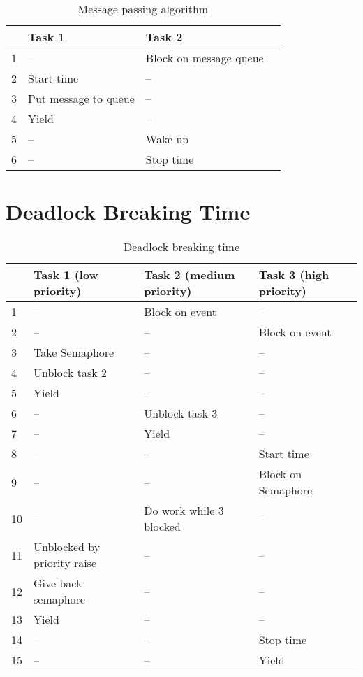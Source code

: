 \begin{table}[htbp]
	\centering
		\begin{tabular}{|l|l|l|l|}
			\hline
				& Task 1 							 & Task 2 								\\
				\hline 
				1 & --									 & Block on message queue	\\
			  2 & Start time		 			 & --											\\
			  3 & Put message to queue & --											\\
			  4 & Yield								 & --											\\
			  5 & --									 & Wake up								\\
			  6 & --									 & Stop time							\\	  
			\hline
		\end{tabular}
	\caption{Message passing algorithm}
	\label{tab_message_passing}
\end{table}

\section{Deadlock Breaking Time}
\begin{table}[htbp]
	\centering
		\begin{tabular}{|l|l|l|l|}
			\hline
				& Task 1 (low priority)						& Task 2 (medium priority)	&  Task 3 (high priority)	\\
				\hline 
				1 & --															& Block on event						& --									\\
			  2 & --															& --												& Block on event			\\
			  3 & Take Semaphore 									& --												& --									\\
			  4 & Unblock task  2									& --							 					& --									\\
			  5 & Yield														& --												& --									\\
			  6 & --															&	Unblock task 3						& --									\\
			  7 & --															& Yield											& --									\\
			  8 & --															&	--												& Start time					\\  
			  9 & --															&	--												& Block on Semaphore	\\  	
			  10 & --															& Do work while 3 blocked		& --									\\	
			  11 & Unblocked by priority raise		&	--												& --									\\
			  12 & Give back semaphore						&	--												& --									\\	
			  13 & Yield													& --	  										& --									\\
			  14 & --															&	--												& Stop time						\\
			  15 & --															&	--												& Yield								\\
			\hline
		\end{tabular}
	\caption{Deadlock breaking time}
	\label{tab_deadlock}
\end{table}

